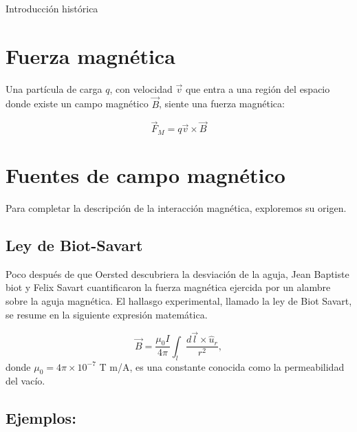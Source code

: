 %
%


Introducción histórica

\section{Fuerza magnética}
Una partícula de carga $q$, con velocidad $\vec{v}$ que entra a una región del espacio donde existe un campo magnético $\vec{B}$, siente una fuerza magnética:

\begin{equation}
\vec{F}_M=q \vec{v} \times \vec{B}
\end{equation}

\section{Fuentes de campo magnético}

Para completar la descripción de la interacción magnética, exploremos su origen.

\subsection{Ley de Biot-Savart}

Poco después de que Oersted descubriera la desviación de la aguja, Jean Baptiste biot y Felix Savart cuantificaron la fuerza magnética ejercida por un alambre sobre la aguja magnética. El hallasgo experimental, llamado la ley de Biot Savart, se resume en la siguiente expresión matemática.

\begin{displaymath}
\vec{B}=\dfrac{\mu_0 I}{4\pi}\int_l \dfrac{d\vec{l} \times \hat{u}_r}{r^2} ,
\end{displaymath}
donde $\mu_0=4\pi \times 10^{-7}$ T m/A, es una constante conocida como la permeabilidad del vacío.

\subsection{Ejemplos:}

